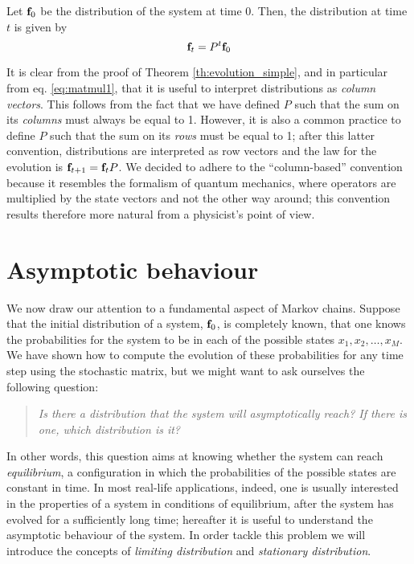 \begin{corollary} \label{th:evolution_complete}
    Let $\mathbf{f}_0$ be the distribution of the system at time 0. Then, the distribution at time $t$ is given by
    \begin{equation}
        \mathbf{f}_t = P^t \mathbf{f}_0
    \end{equation}
\end{corollary}

\begin{remark}
    It is clear from the proof of Theorem \ref{th:evolution_simple}, and in particular from eq. \ref{eq:matmul1}, that it is useful to interpret distributions as \emph{column vectors}. This follows from the fact that we have defined $P$ such that the sum on its \emph{columns} must always be equal to 1. However, it is also a common practice to define $P$ such that the sum on its \emph{rows} must be equal to 1; after this latter convention, distributions are interpreted as row vectors and the law for the evolution is $\mathbf{f}_{t+1} = \mathbf{f}_t P$. We decided to adhere to the \enquote{column-based} convention because it resembles the formalism of quantum mechanics, where operators are multiplied by the state vectors and not the other way around; this convention results therefore more natural from a physicist's point of view.
\end{remark}

\section{Asymptotic behaviour}
We now draw our attention to a fundamental aspect of Markov chains. Suppose that the initial distribution of a system, $\mathbf{f}_0$, is completely known, \ie that one knows the probabilities for the system to be in each of the possible states $x_1, x_2, \dots, x_M$. We have shown how to compute the evolution of these probabilities for any time step using the stochastic matrix, but we might want to ask ourselves the following question:
\begin{quote}
    \emph{Is there a distribution that the system will asymptotically reach? If there is one, which distribution is it?}
\end{quote}
In other words, this question aims at knowing whether the system can reach \emph{equilibrium}, \ie a configuration in which the probabilities of the possible states are constant in time.
In most real-life applications, indeed, one is usually interested in the properties of a system in conditions of equilibrium, after the system has evolved for a sufficiently long time; hereafter it is useful to understand the asymptotic behaviour of the system. In order tackle this problem we will introduce the concepts of \emph{limiting distribution} and \emph{stationary distribution}.

